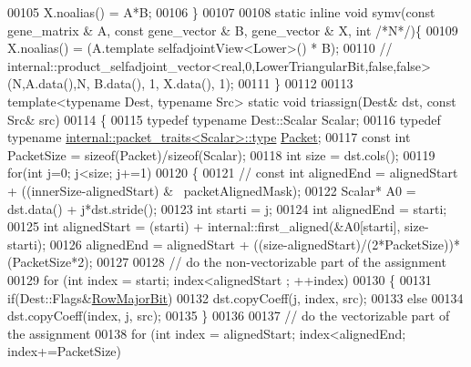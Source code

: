 \begin{DoxyCode}
00105     X.noalias() = A*B;
00106   \}
00107 
00108   \textcolor{keyword}{static} \textcolor{keyword}{inline} \textcolor{keywordtype}{void} symv(\textcolor{keyword}{const} gene\_matrix & A, \textcolor{keyword}{const} gene\_vector & B, gene\_vector & X, \textcolor{keywordtype}{int}  \textcolor{comment}{/*N*/})\{
00109     X.noalias() = (A.template selfadjointView<Lower>() * B);
00110 \textcolor{comment}{//     internal::product\_selfadjoint\_vector<real,0,LowerTriangularBit,false,false>(N,A.data(),N, B.data(),
       1, X.data(), 1);}
00111   \}
00112 
00113   \textcolor{keyword}{template}<\textcolor{keyword}{typename} Dest, \textcolor{keyword}{typename} Src> \textcolor{keyword}{static} \textcolor{keywordtype}{void} triassign(Dest& dst, \textcolor{keyword}{const} Src& src)
00114   \{
00115     \textcolor{keyword}{typedef} \textcolor{keyword}{typename} Dest::Scalar Scalar;
00116     \textcolor{keyword}{typedef} \textcolor{keyword}{typename} \hyperlink{group___sparse_core___module}{internal::packet\_traits<Scalar>::type} 
      \hyperlink{group___sparse_core___module}{Packet};
00117     \textcolor{keyword}{const} \textcolor{keywordtype}{int} PacketSize = \textcolor{keyword}{sizeof}(Packet)/\textcolor{keyword}{sizeof}(Scalar);
00118     \textcolor{keywordtype}{int} size = dst.cols();
00119     \textcolor{keywordflow}{for}(\textcolor{keywordtype}{int} j=0; j<size; j+=1)
00120     \{
00121 \textcolor{comment}{//       const int alignedEnd = alignedStart + ((innerSize-alignedStart) & ~packetAlignedMask);}
00122       Scalar* A0 = dst.data() + j*dst.stride();
00123       \textcolor{keywordtype}{int} starti = j;
00124       \textcolor{keywordtype}{int} alignedEnd = starti;
00125       \textcolor{keywordtype}{int} alignedStart = (starti) + internal::first\_aligned(&A0[starti], size-starti);
00126       alignedEnd = alignedStart + ((size-alignedStart)/(2*PacketSize))*(PacketSize*2);
00127 
00128       \textcolor{comment}{// do the non-vectorizable part of the assignment}
00129       \textcolor{keywordflow}{for} (\textcolor{keywordtype}{int} index = starti; index<alignedStart ; ++index)
00130       \{
00131         \textcolor{keywordflow}{if}(Dest::Flags&\hyperlink{group__flags_gae4f56c2a60bbe4bd2e44c5b19cbe8762}{RowMajorBit})
00132           dst.copyCoeff(j, index, src);
00133         \textcolor{keywordflow}{else}
00134           dst.copyCoeff(index, j, src);
00135       \}
00136 
00137       \textcolor{comment}{// do the vectorizable part of the assignment}
00138       \textcolor{keywordflow}{for} (\textcolor{keywordtype}{int} index = alignedStart; index<alignedEnd; index+=PacketSize)

\end{DoxyCode}
